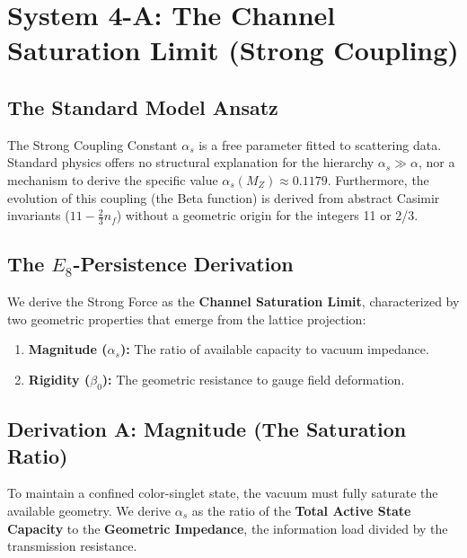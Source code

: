 \section{System 4-A: The Channel Saturation Limit (Strong Coupling)} \label{sec:Saturation_Limit}





\subsection{The Standard Model Ansatz}
The Strong Coupling Constant $\alpha_s$ is a free parameter fitted to scattering data. Standard physics offers no structural explanation for the hierarchy $\alpha_s \gg \alpha$, nor a mechanism to derive the specific value $\alpha_s(M_Z) \approx 0.1179$. Furthermore, the evolution of this coupling (the Beta function) is derived from abstract Casimir invariants ($11 - \frac{2}{3}n_f$) without a geometric origin for the integers 11 or 2/3.

\subsection{The \texorpdfstring{$E_8$}{E8}-Persistence Derivation}
We derive the Strong Force as the \textbf{Channel Saturation Limit}, characterized by two geometric properties that emerge from the lattice projection:
\begin{enumerate}
    \item \textbf{Magnitude ($\alpha_s$):} The ratio of available capacity to vacuum impedance.
    \item \textbf{Rigidity ($\beta_0$):} The geometric resistance to gauge field deformation.
\end{enumerate}

\subsection{Derivation A: Magnitude (The Saturation Ratio)}
To maintain a confined color-singlet state, the vacuum must fully saturate the available geometry. We derive $\alpha_s$ as the ratio of the \textbf{Total Active State Capacity} to the \textbf{Geometric Impedance}, the information load divided by the transmission resistance.


